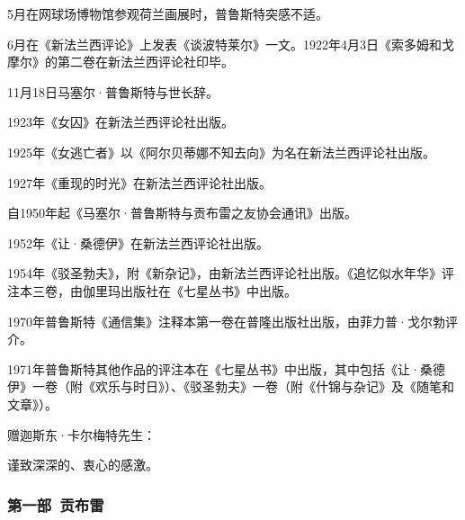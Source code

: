 \par 5月在网球场博物馆参观荷兰画展时，普鲁斯特突感不适。
\par 6月在《新法兰西评论》上发表《谈波特莱尔》一文。1922年4月3日《索多姆和戈摩尔》的第二卷在新法兰西评论社印毕。
\par 11月18日马塞尔·普鲁斯特与世长辞。
\par 1923年《女囚》在新法兰西评论社出版。
\par 1925年《女逃亡者》以《阿尔贝蒂娜不知去向》为名在新法兰西评论社出版。
\par 1927年《重现的时光》在新法兰西评论社出版。
\par 自1950年起《马塞尔·普鲁斯特与贡布雷之友协会通讯》出版。
\par 1952年《让·桑德伊》在新法兰西评论社出版。
\par 1954年《驳圣勃夫》，附《新杂记》，由新法兰西评论社出版。《追忆似水年华》评注本三卷，由伽里玛出版社在《七星丛书》中出版。
\par 1970年普鲁斯特《通信集》注释本第一卷在普隆出版社出版，由菲力普·戈尔勃评介。
\par 1971年普鲁斯特其他作品的评注本在《七星丛书》中出版，其中包括《让·桑德伊》一卷（附《欢乐与时日》）、《驳圣勃夫》一卷（附《什锦与杂记》及《随笔和文章》）。
\par 赠迦斯东·卡尔梅特先生：
\par 谨致深深的、衷心的感激。
\par {}


\subsubsection*{第一部\ 贡布雷}


